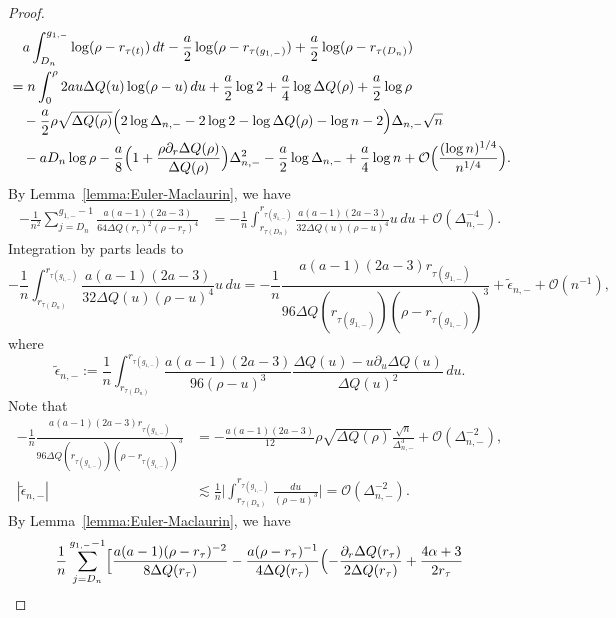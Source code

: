 \documentclass[reqno]{amsart}
\newcommand{\1}{\mathds{1}}
\numberwithin{equation}{section}
\theoremstyle{definition}
\begin{document}
\begin{proof}
\begin{align*}
&\quad
a\int_{D_n}^{g_{1,-}}\log(\rho-r_{\tau(t)})\,dt
-\frac{a}{2}\log(\rho-r_{\tau(g_{1,-})})
+\frac{a}{2}\log(\rho-r_{\tau(D_n)})
\\
&=
n\int_{0}^{\rho}2a u\Delta Q(u)\log(\rho-u)\,du
+\frac{a}{2}\log 2
+\frac{a}{4}\log\Delta Q(\rho)
+\frac{a}{2}\log\rho
\\
&\quad
-\frac{a}{2}\rho\sqrt{\Delta Q(\rho)}
\Bigl(2\log\Delta_{n,-}-2\log 2 -\log\Delta Q(\rho)-\log n-2\Bigr)\Delta_{n,-}\sqrt{n}
\\
&\quad
-aD_{n}\log\rho
-\frac{a}{8}\Bigl(1+\frac{\rho\partial_r\Delta Q(\rho)}{\Delta Q(\rho)}\Bigr)\Delta_{n,-}^2
-\frac{a}{2}\log\Delta_{n,-}
+\frac{a}{4}\log n
+\mathcal{O}\Bigl(\frac{(\log n)^{1/4}}{n^{1/4}}\Bigr). 
\end{align*}
By Lemma~\ref{lemma:Euler-Maclaurin}, we have 
\begin{align*}
-\frac{1}{n^2}
\sum_{j=D_n}^{g_{1,-}-1}
\frac{a(a-1)(2a-3)}{64\Delta Q(r_{\tau})^2(\rho-r_{\tau})^4}
&=
-\frac{1}{n}\int_{r_{\tau(D_n)}}^{r_{\tau(g_{1,-})}}
\frac{a(a-1)(2a-3)}{32\Delta Q(u)(\rho-u)^4}u\,du+\mathcal{O}(\Delta_{n,-}^{-4}).
\end{align*}
Integration by parts leads to
\[
-\frac{1}{n}\int_{r_{\tau(D_n)}}^{r_{\tau(g_{1,-})}}
\frac{a(a-1)(2a-3)}{32\Delta Q(u)(\rho-u)^4}u\,du
=
-
\frac{1}{n}\frac{a(a-1)(2a-3)r_{\tau(g_{1,-})}}{96\Delta Q(r_{\tau(g_{1,-})})(\rho-r_{\tau(g_{1,-})})^3}
+
\widetilde{\epsilon}_{n,-}
+
\mathcal{O}(n^{-1}), 
\]
where 
\[
\widetilde{\epsilon}_{n,-}:=\frac{1}{n}\int_{r_{\tau(D_n)}}^{r_{\tau(g_{1,-})}}
\frac{a(a-1)(2a-3)}{96(\rho-u)^3}\frac{\Delta Q(u)-u\partial_u\Delta Q(u)}{\Delta Q(u)^2}\,du. 
\]
Note that 
\begin{align*}
-
\frac{1}{n}\frac{a(a-1)(2a-3)r_{\tau(g_{1,-})}}{96\Delta Q(r_{\tau(g_{1,-})})(\rho-r_{\tau(g_{1,-})})^3}
&=-\frac{a(a-1)(2a-3)}{12}\rho\sqrt{\Delta Q(\rho)}\frac{\sqrt{n}}{\Delta_{n,-}^3}+\mathcal{O}(\Delta_{n,-}^{-2}), 
\\
|\widetilde{\epsilon}_{n,-}|&\lesssim \frac{1}{n}\bigg|\int_{r_{\tau(D_n)}}^{r_{\tau(g_{1,-})}}\frac{du}{(\rho-u)^3}\bigg|=\mathcal{O}(\Delta_{n,-}^{-2}).
\end{align*}
By Lemma~\ref{lemma:Euler-Maclaurin}, we have 
\begin{align*}
&\quad\frac{1}{n}\sum_{j=D_n}^{g_{1,-}-1}
\Bigl[
\frac{a(a-1)(\rho-r_{\tau})^{-2}}{8\Delta Q(r_{\tau})}
-\frac{a(\rho-r_{\tau})^{-1}}{4\Delta Q(r_{\tau})}
\Bigl( 
-\frac{\partial_r\Delta Q(r_{\tau})}{2\Delta Q(r_{\tau})}+\frac{4\alpha+3}{2r_{\tau}}

\end{align*}
\end{proof}
\end{document}
